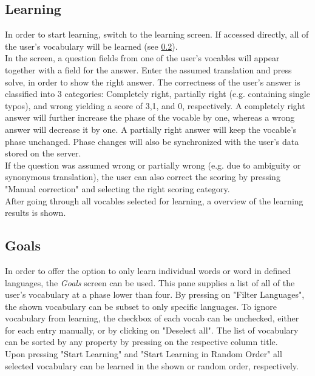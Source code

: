         \subsection{Learning}
        In order to start learning, switch to the learning screen. If accessed directly, all of the user's vocabulary will be learned (see \cref{goals}). \\
        In the screen, a question fields from one of the user's vocables will appear together with a field for the answer. Enter the assumed translation and press solve, in order to show the right answer. The correctness of the user's answer is classified into 3 categories: Completely right, partially right (e.g. containing single typos), and wrong yielding a score of 3,1, and 0, respectively. A completely right answer will further increase the phase of the vocable by one, whereas a wrong answer will decrease it by one. A partially right answer will keep the vocable's phase unchanged. Phase changes will also be synchronized with the user's data stored on the server.\\
        If the question was assumed wrong or partially wrong (e.g. due to ambiguity or synonymous translation), the user can also correct the scoring by pressing "Manual correction" and selecting the right scoring category. \\
        After going through all vocables selected for learning, a overview of the learning results is shown.\\
        
        \subsection{Goals} \label{goals}
        In order to offer the option to only learn individual words or word in defined languages, the \textit{Goals} screen can be used. This pane supplies a list of all of the user's vocabulary at a phase lower than four. By pressing on "Filter Languages", the shown vocabulary can be subset to only specific languages. To ignore vocabulary from learning, the checkbox of each vocab can be unchecked, either for each entry manually, or by clicking on "Deselect all". The list of vocabulary can be sorted by any property by pressing on the respective column title. \\
        Upon pressing "Start Learning" and "Start Learning in Random Order" all selected vocabulary can be learned in the shown or random order, respectively.
